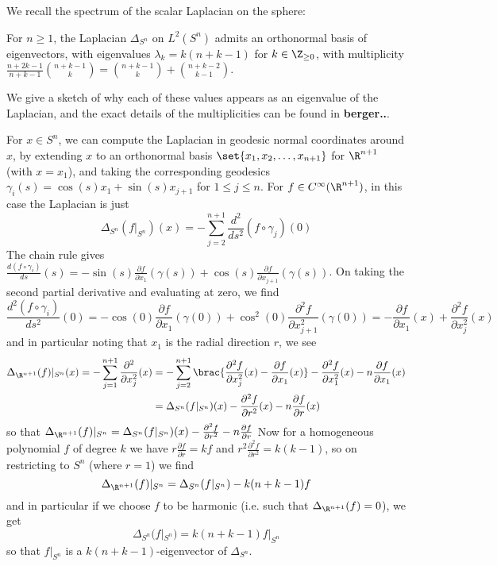 \documentclass[11pt]{report}
\begin{document}
We recall the spectrum of the scalar Laplacian on the sphere:
\begin{theorem}
    For $n \geq 1$, the Laplacian $\Delta_{S^n}$ on $L^2(S^n)$ admits an orthonormal basis of eigenvectors, with eigenvalues $\lambda_k = k(n + k - 1)$ for $k \in \Z_{\geq 0}$, with multiplicity $\frac{n + 2k - 1}{n + k - 1}{n + k - 1 \choose k} = {n + k - 1 \choose k} + {n + k - 2 \choose k - 1}$.
\end{theorem}
We give a sketch of why each of these values appears as an eigenvalue of the Laplacian, and the exact details of the multiplicities can be found in \textbf{berger..}.

For $x \in S^n$, we can compute the Laplacian in geodesic normal coordinates around $x$, by extending $x$ to an orthonormal basis $\set{x_1, x_2, \ldots, x_{n + 1}}$ for $\R^{n + 1}$ (with $x = x_1$), and taking the corresponding geodesics $\gamma_i(s) = \cos(s)x_1 + \sin(s)x_{j + 1}$ for $1 \leq j \leq n$. For $f \in C^\infty(\R^{n + 1})$, in this case the Laplacian is just
$$
    \Delta_{S^n}(f|_{S^n})(x) = -\sum_{j = 2}^{n + 1}\frac{d^2}{ds^2}(f \circ \gamma_j)(0)
$$
The chain rule gives $\frac{d(f \circ \gamma_i)}{ds}(s) = -\sin(s)\frac{\partial f}{\partial x_1}(\gamma(s)) + \cos(s)\frac{\partial f}{\partial x_{j + 1}}(\gamma(s))$. On taking the second partial derivative and evaluating at zero, we find
$$
    \frac{d^2(f \circ \gamma_i)}{ds^2}(0) = -\cos(0)\frac{\partial f}{\partial x_1}(\gamma(0)) + \cos^2(0)\frac{\partial^2 f}{\partial x_{j + 1}^2}(\gamma(0)) = -\frac{\partial f}{\partial x_1}(x) + \frac{\partial^2 f}{\partial x_j^2}(x)
$$
and in particular noting that $x_1$ is the radial direction $r$, we see
\begin{align*}
    \Delta_{\R^{n + 1}}(f)|_{S^n}(x) = -\sum_{j = 1}^{n + 1}\frac{\partial^2}{\partial x_j^2}(x) &= -\sum_{j = 2}^{n + 1}\brac{\frac{\partial^2 f}{\partial x_j^2}(x) - \frac{\partial f}{\partial x_1}(x)} - \frac{\partial^2 f}{\partial x_1^2}(x) - n\frac{\partial f}{\partial x_1}(x) \\ 
    &= \Delta_{S^n}(f|_{S^n})(x) - \frac{\partial^2 f}{\partial r^2}(x) - n\frac{\partial f}{\partial r}(x)
\end{align*}
so that $\Delta_{\R^{n + 1}}(f)|_{S^n} = \Delta_{S^n}(f|_{S^n})(x) - \frac{\partial^2 f}{\partial r^2} - n\frac{\partial f}{\partial r}$ Now for a homogeneous polynomial $f$ of degree $k$ we have $r\frac{\partial f}{\partial r} = kf$ and $r^2\frac{\partial^2 f}{\partial r^2} = k(k - 1)$, so on restricting to $S^n$ (where $r = 1$) we find
$$
    \Delta_{\R^{n + 1}}(f)|_{S^n} = \Delta_{S^n}(f|_{S^n}) - k(n + k - 1)f
$$
and in particular if we choose $f$ to be harmonic (i.e. such that $\Delta_{\R^{n + 1}}(f) = 0$), we get 
$$
    \Delta_{S^n}(f|_{S^n}) = k(n + k - 1)f|_{S^n}
$$
so that $f|_{S^n}$ is a $k(n + k - 1)$-eigenvector of $\Delta_{S^n}$. 
\end{document}
